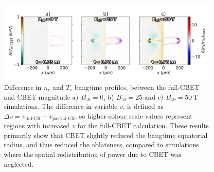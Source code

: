 \begin{figure}[t!]
    \includegraphics[width=\linewidth]{Results2/Images/CBETshape_stag_diff.png}
    \centering
    \caption{Difference in $n_e$ and $T_e$ bangtime profiles, between the full-\ac{CBET} and \ac{CBET}-magnitude a) $B_{z0}=0$, b) $B_{z0}=25$ and c) $B_{z0}=50\ \text{T}$ simulations.
    The difference in variable $v$, is defined as $\Delta v = v_{\text{full-CB}}-v_{\text{partial-CB}}$, so higher colour scale values represent regions with increased $v$ for the full-\ac{CBET} calculation.
    These results primarily show that \ac{CBET} slightly reduced the bangtime equatorial radius, and thus reduced the oblateness, compared to simulations where the spatial redistribution of power due to \ac{CBET} was neglected.}%
    \label{fig:Res2_CBETshape_diff}
\end{figure}

